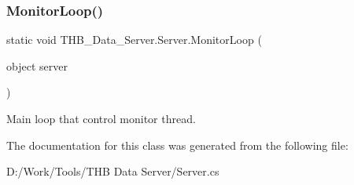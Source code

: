 \subsubsection{\texorpdfstring{Monitor\+Loop()}{MonitorLoop()}}
{\footnotesize\ttfamily static void T\+H\+B\+\_\+\+Data\+\_\+\+Server.\+Server.\+Monitor\+Loop (\begin{DoxyParamCaption}\item[{object}]{server }\end{DoxyParamCaption})\hspace{0.3cm}{\ttfamily [static]}}



Main loop that control monitor thread. 



The documentation for this class was generated from the following file\+:\begin{DoxyCompactItemize}
\item 
D\+:/\+Work/\+Tools/\+T\+H\+B Data Server/Server.\+cs\end{DoxyCompactItemize}
